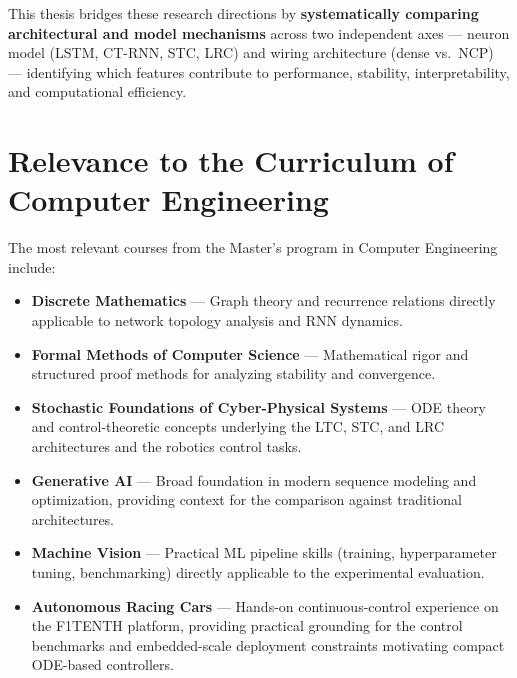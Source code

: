 \documentclass[11pt,a4paper]{article}
\begin{document}
This thesis bridges these research directions by \textbf{systematically comparing architectural and model mechanisms} across two independent axes --- neuron model (LSTM, CT-RNN, STC, LRC) and wiring architecture (dense vs.\ NCP) --- identifying which features contribute to performance, stability, interpretability, and computational efficiency.

\newpage
\section{Relevance to the Curriculum of Computer Engineering}

The most relevant courses from the Master's program in Computer Engineering include:

\begin{itemize}
\item \textbf{Discrete Mathematics} — Graph theory and recurrence relations directly applicable to network topology analysis and RNN dynamics.
\item \textbf{Formal Methods of Computer Science} — Mathematical rigor and structured proof methods for analyzing stability and convergence.
\item \textbf{Stochastic Foundations of Cyber-Physical Systems} — ODE theory and control-theoretic concepts underlying the LTC, STC, and LRC architectures and the robotics control tasks.
\item \textbf{Generative AI} — Broad foundation in modern sequence modeling and optimization, providing context for the comparison against traditional architectures.
\item \textbf{Machine Vision} — Practical ML pipeline skills (training, hyperparameter tuning, benchmarking) directly applicable to the experimental evaluation.
\item \textbf{Autonomous Racing Cars} — Hands-on continuous-control experience on the F1TENTH platform, providing practical grounding for the control benchmarks and embedded-scale deployment constraints motivating compact ODE-based controllers.
\end{itemize}

\newpage


\end{document}
